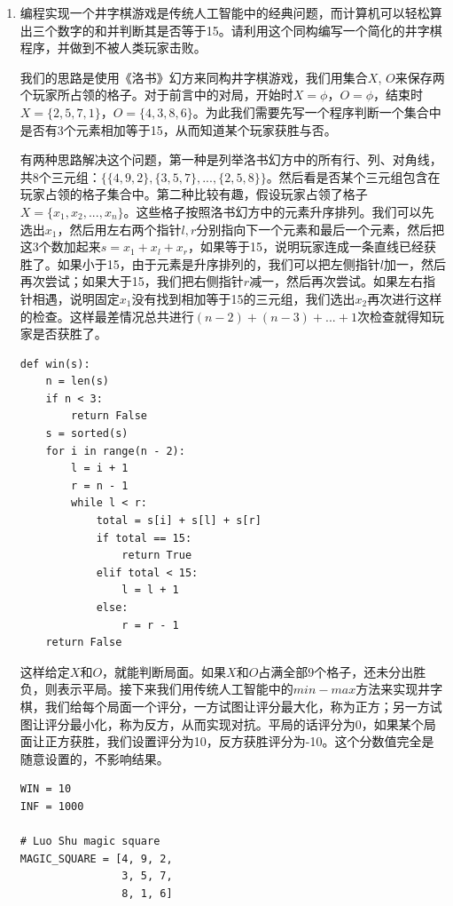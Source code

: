 \documentclass[UTF8]{article}
\begin{document}
\begin{enumerate}
\item 编程实现一个井字棋游戏是传统人工智能中的经典问题，而计算机可以轻松算出三个数字的和并判断其是否等于15。请利用这个同构编写一个简化的井字棋程序，并做到不被人类玩家击败。

我们的思路是使用《洛书》幻方来同构井字棋游戏，我们用集合$X$, $O$来保存两个玩家所占领的格子。对于前言中的对局，开始时$X = \phi$，$O = \phi$，结束时$X = \{ 2, 5, 7, 1 \}$，$O = \{ 4, 3, 8, 6 \}$。为此我们需要先写一个程序判断一个集合中是否有3个元素相加等于15，从而知道某个玩家获胜与否。

有两种思路解决这个问题，第一种是列举洛书幻方中的所有行、列、对角线，共8个三元组：$\{ \{4, 9, 2\}, \{3, 5, 7\}, ..., \{2, 5, 8\} \}$。然后看是否某个三元组包含在玩家占领的格子集合中。第二种比较有趣，假设玩家占领了格子$ X = \{x_1, x_2, ..., x_n\}$。这些格子按照洛书幻方中的元素升序排列。我们可以先选出$x_1$，然后用左右两个指针$l, r$分别指向下一个元素和最后一个元素，然后把这3个数加起来$s = x_1 + x_l + x_r$，如果等于15，说明玩家连成一条直线已经获胜了。如果小于15，由于元素是升序排列的，我们可以把左侧指针$l$加一，然后再次尝试；如果大于15，我们把右侧指针$r$减一，然后再次尝试。如果左右指针相遇，说明固定$x_1$没有找到相加等于15的三元组，我们选出$x_2$再次进行这样的检查。这样最差情况总共进行$(n - 2)+ (n - 3) + ... + 1$次检查就得知玩家是否获胜了。

\lstset{language=Python
    , frame=single
}
\begin{lstlisting}
def win(s):
    n = len(s)
    if n < 3:
        return False
    s = sorted(s)
    for i in range(n - 2):
        l = i + 1
        r = n - 1
        while l < r:
            total = s[i] + s[l] + s[r]
            if total == 15:
                return True
            elif total < 15:
                l = l + 1
            else:
                r = r - 1
    return False
\end{lstlisting}

这样给定$X$和$O$，就能判断局面。如果$X$和$O$占满全部9个格子，还未分出胜负，则表示平局。接下来我们用传统人工智能中的$min-max$方法来实现井字棋，我们给每个局面一个评分，一方试图让评分最大化，称为正方；另一方试图让评分最小化，称为反方，从而实现对抗。平局的话评分为0，如果某个局面让正方获胜，我们设置评分为10，反方获胜评分为-10。这个分数值完全是随意设置的，不影响结果。

\begin{lstlisting}
WIN = 10
INF = 1000

# Luo Shu magic square
MAGIC_SQUARE = [4, 9, 2,
                3, 5, 7,
                8, 1, 6]


\end{lstlisting}
\end{enumerate}
\end{document}
